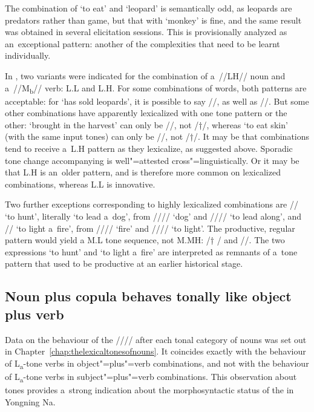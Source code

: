The combination of ‘to eat’ and ‘leopard’ is semantically odd, as
leopards are predators rather than game, but that with ‘monkey’ is fine, and the same result was
obtained in several elicitation sessions. This is provisionally analyzed as an~exceptional
pattern: another of the complexities that need to be learnt individually.

In , two variants were indicated for the combination of a~\mbox{//LH//} noun and a~\mbox{//M\textsubscript{b}//} verb: L.L and L.H. For some combinations of words, both patterns are acceptable: for ‘has sold leopards’, it is
possible to say //, as well as //. But some other combinations
have apparently lexicalized with one tone pattern or the other: ‘brought in the harvest’ can only be //, not /†/, whereas ‘to eat skin’ (with the same input tones) can only be
//, not /†/. It may be that combinations tend to receive a~L.H
pattern as they lexicalize, as suggested above. Sporadic tone change accompanying  is well"=attested cross"=linguistically. Or it may be that L.H is an~older pattern, and is therefore more common on lexicalized combinations, whereas L.L is innovative.

Two further exceptions corresponding to highly lexicalized combinations are // ‘to hunt’,
literally ‘to lead a~dog’, from //// ‘dog’ and //// ‘to lead along’, and //
‘to light a~fire’, from  //// ‘fire’ and //// ‘to light’. The productive,
regular pattern would yield a M.L tone sequence, not M.MH: \mbox{/†} / and //. The two expressions ‘to hunt’ and ‘to light a~fire’ are interpreted as remnants of a~tone pattern that used to be productive at an earlier historical stage.


\subsection[Noun plus copula behaves tonally like O+V]{Noun plus copula behaves tonally like object plus verb}
\label{sec:nounsplusthecopulabehavetonallylikeobjectverbcombinations}

Data on the behaviour of the  //// after each tonal category of nouns was set out in Chapter~\ref{chap:thelexicaltonesofnouns}. It
coincides exactly with the behaviour of L\textsubscript{a}-tone verbs in object"=plus"=verb combinations, and not
with the behaviour of L\textsubscript{a}-tone verbs in subject"=plus"=verb combinations. This observation about
tones provides a~strong indication about the morphosyntactic status of the  in Yongning Na.


